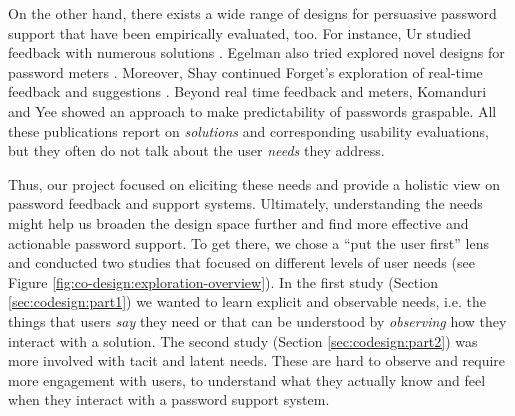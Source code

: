 On the other hand, there exists a wide range of designs for persuasive password support that have been empirically evaluated, too. For instance, Ur \etal studied feedback with numerous solutions \cite{Ur2012HelpingUsersCreateBetterPasswords,Ur2012HowDoesYourPasswordMeasureUp, Ur2017DataDrivenPWMeter}. Egelman \etal also tried explored novel designs for password meters \cite{Egelman2013DoesMyPasswordGoUpToEleven}. Moreover, Shay \etal continued Forget's exploration of real-time feedback and suggestions \cite{Forget2008ImprovingPasswordsThroughPersuasion, Shay2015SpoonfulOfSugar}. Beyond real time feedback and meters, Komanduri \etal \cite{Komanduri2014Telepathwords} and Yee \cite{Yee2006Passpet} showed an approach to make predictability of passwords graspable. All these publications report on \textit{solutions} and corresponding usability evaluations, but they often do not talk about the user \textit{needs} they address. 

Thus, our project focused on eliciting these needs and provide a holistic view on password feedback and support systems. Ultimately, understanding the needs might help us broaden the design space further and find more effective and actionable password support. To get there, we chose a ``put the user first'' lens and conducted two studies that focused on different levels of user needs (see Figure \ref{fig:co-design:exploration-overview}). In the first study (Section \ref{sec:codesign:part1}) we wanted to learn explicit and observable needs, i.e. the things that users \textit{say} they need or that can be understood by \textit{observing} how they interact with a solution. 
The second study (Section \ref{sec:codesign:part2}) was more involved with tacit and latent needs. These are hard to observe and require more engagement with users, to understand what they actually know and feel when they interact with a password support system. 




